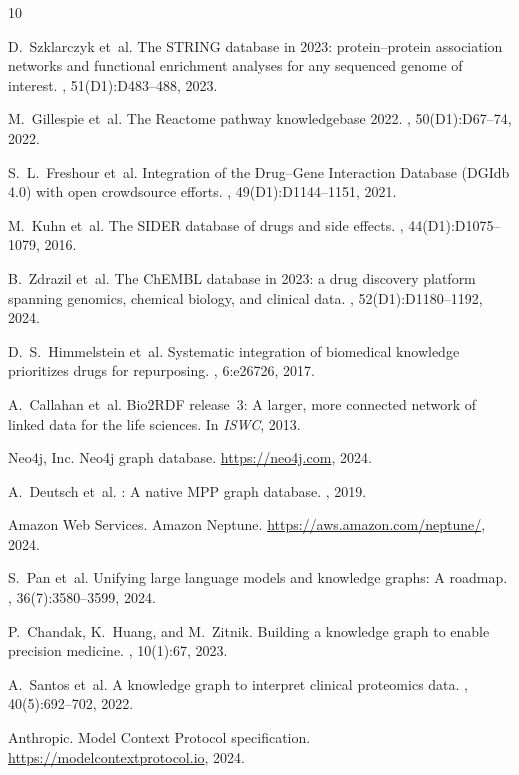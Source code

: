 \documentclass[sigconf]{acmart}
\begin{document}

\begin{thebibliography}{10}

D.~Szklarczyk et~al.
\newblock The {STRING} database in 2023: protein--protein association networks
  and functional enrichment analyses for any sequenced genome of interest.
, 51(D1):D{483--488}, 2023.

M.~Gillespie et~al.
\newblock The {Reactome} pathway knowledgebase 2022.
, 50(D1):D{67--74}, 2022.

S.~L.~Freshour et~al.
\newblock Integration of the {Drug--Gene Interaction Database (DGIdb 4.0)}
  with open crowdsource efforts.
, 49(D1):D{1144--1151}, 2021.

M.~Kuhn et~al.
\newblock The {SIDER} database of drugs and side effects.
, 44(D1):D{1075--1079}, 2016.

B.~Zdrazil et~al.
\newblock The {ChEMBL} database in 2023: a drug discovery platform spanning
  genomics, chemical biology, and clinical data.
, 52(D1):D{1180--1192}, 2024.

D.~S.~Himmelstein et~al.
\newblock Systematic integration of biomedical knowledge prioritizes drugs for
  repurposing.
, 6:e26726, 2017.

A.~Callahan et~al.
\newblock Bio2{RDF} release~3: A larger, more connected network of linked data
  for the life sciences.
\newblock In {\em ISWC}, 2013.

Neo4j, Inc.
\newblock Neo4j graph database. \url{https://neo4j.com}, 2024.

A.~Deutsch et~al.
: A native {MPP} graph database.
, 2019.

Amazon Web Services.
\newblock Amazon {Neptune}. \url{https://aws.amazon.com/neptune/}, 2024.

S.~Pan et~al.
\newblock Unifying large language models and knowledge graphs: A roadmap.
, 36(7):3580--3599, 2024.

P.~Chandak, K.~Huang, and M.~Zitnik.
\newblock Building a knowledge graph to enable precision medicine.
, 10(1):67, 2023.

A.~Santos et~al.
\newblock A knowledge graph to interpret clinical proteomics data.
, 40(5):692--702, 2022.

Anthropic.
\newblock Model {Context Protocol} specification.
\newblock \url{https://modelcontextprotocol.io}, 2024.

\end{thebibliography}
\end{document}
